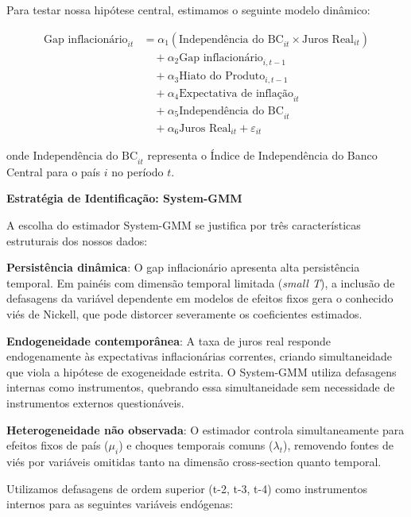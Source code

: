 \documentclass[a4paper,12pt]{article}
\begin{document}

Para testar nossa hipótese central, estimamos o seguinte modelo dinâmico:

\begin{equation}\label{eq:gmm_gap_order}
\begin{aligned}
\text{Gap inflacionário}_{it} &= \alpha_{1}(\text{Independência do BC}_{it} \times \text{Juros Real}_{it}) \\
&\quad + \alpha_{2}\text{Gap inflacionário}_{i,t-1} \\
&\quad + \alpha_{3}\text{Hiato do Produto}_{i,t-1} \\
&\quad + \alpha_{4}\text{Expectativa de inflação}_{it} \\
&\quad + \alpha_{5}\text{Independência do BC}_{it} \\
&\quad + \alpha_{6}\text{Juros Real}_{it} + \varepsilon_{it}
\end{aligned}
\end{equation}

\noindent onde $\text{Independência do BC}_{it}$ representa o Índice de Independência do Banco Central para o país $i$ no período $t$.

\textbf{Estratégia de Identificação: System-GMM}

A escolha do estimador System-GMM \cite{CameronTrivedi2005} se justifica por três características estruturais dos nossos dados:

\textbf{Persistência dinâmica}: O gap inflacionário apresenta alta persistência temporal. Em painéis com dimensão temporal limitada (\emph{small T}), a inclusão de defasagens da variável dependente em modelos de efeitos fixos gera o conhecido viés de Nickell, que pode distorcer severamente os coeficientes estimados.

\textbf{Endogeneidade contemporânea}: A taxa de juros real responde endogenamente às expectativas inflacionárias correntes, criando simultaneidade que viola a hipótese de exogeneidade estrita. O System-GMM utiliza defasagens internas como instrumentos, quebrando essa simultaneidade sem necessidade de instrumentos externos questionáveis.

\textbf{Heterogeneidade não observada}: O estimador controla simultaneamente para efeitos fixos de país ($\mu_i$) e choques temporais comuns ($\lambda_t$), removendo fontes de viés por variáveis omitidas tanto na dimensão cross-section quanto temporal.

Utilizamos defasagens de ordem superior (t-2, t-3, t-4) como instrumentos internos para as seguintes variáveis endógenas:
\end{document}
